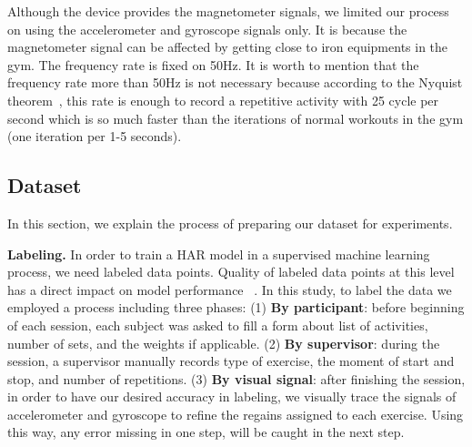 \documentclass[journal,article,submit,moreauthors,pdftex]{Definitions/mdpi}
\begin{document}
Although the device provides the magnetometer signals, we limited our process on using the accelerometer and gyroscope signals only. It is because the magnetometer signal can be affected by getting close to iron equipments in the gym. The frequency rate is fixed on 50Hz. It is worth to mention that the frequency rate more than 50Hz is not necessary because according to the Nyquist theorem~\cite{mazo1975faster}, this rate is enough to record a repetitive activity with 25 cycle per second which is so much faster than the iterations of normal workouts in the gym (one iteration per 1-5 seconds).

\subsection{Dataset}
In this section, we explain the process of preparing our dataset for experiments.

\noindent \textbf{Labeling.} In order to train a HAR model in a supervised machine learning process, we need labeled data points. Quality of labeled data points at this level has a direct impact on model performance ~\cite{janidarmian2017comprehensive}. In this study, 
to label the data we employed a process including three phases: (1) \textbf{By participant}: before beginning of each session, each subject was asked to fill a form about list of activities, number of sets, and the weights if applicable. (2) \textbf{By supervisor}: during the session, a supervisor manually records type of exercise, the moment of start and stop, and number of repetitions. (3) \textbf{By visual signal}: after finishing the session, in order to have our desired accuracy in labeling, we visually trace the signals of accelerometer and gyroscope to refine the regains assigned to each exercise. Using this way, any error missing in one step, will be caught in the next step.
\end{document}
